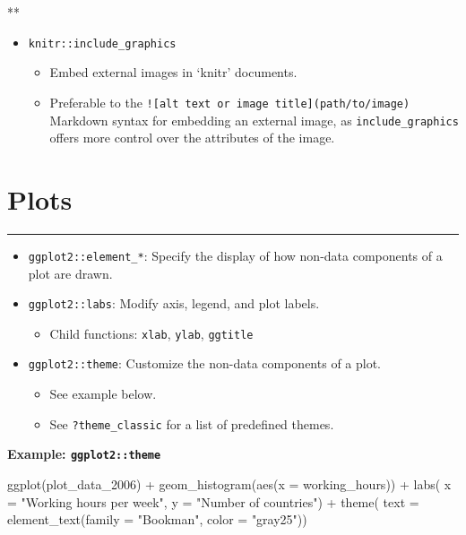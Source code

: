 \documentclass[
]{book}
\newenvironment{Shaded}{\begin{snugshade}}{\end{snugshade}}
\newcommand{\AttributeTok}[1]{\textcolor[rgb]{0.77,0.63,0.00}{#1}}
\newcommand{\FunctionTok}[1]{\textcolor[rgb]{0.00,0.00,0.00}{#1}}
\newcommand{\NormalTok}[1]{#1}
\newcommand{\SpecialCharTok}[1]{\textcolor[rgb]{0.00,0.00,0.00}{#1}}
\newcommand{\StringTok}[1]{\textcolor[rgb]{0.31,0.60,0.02}{#1}}
\providecommand{\tightlist}{%
  \setlength{\itemsep}{0pt}\setlength{\parskip}{0pt}}
\begin{document}
**

\begin{itemize}
\tightlist
\item
  \texttt{knitr::include\_graphics}

  \begin{itemize}
  \tightlist
  \item
    Embed external images in `knitr' documents.
  \item
    Preferable to the \texttt{!{[}alt\ text\ or\ image\ title{]}(path/to/image)} Markdown syntax for embedding an external image, as \texttt{include\_graphics} offers more control over the attributes of the image.
  \end{itemize}
\end{itemize}

\hypertarget{plots}{%
\section{Plots}\label{plots}}

\begin{center}\rule{0.5\linewidth}{0.5pt}\end{center}

\begin{itemize}
\tightlist
\item
  \texttt{ggplot2::element\_*}: Specify the display of how non-data components of a plot are drawn.
\item
  \texttt{ggplot2::labs}: Modify axis, legend, and plot labels.

  \begin{itemize}
  \tightlist
  \item
    Child functions: \texttt{xlab}, \texttt{ylab}, \texttt{ggtitle}
  \end{itemize}
\item
  \texttt{ggplot2::theme}: Customize the non-data components of a plot.

  \begin{itemize}
  \tightlist
  \item
    See example below.
  \item
    See \texttt{?theme\_classic} for a list of predefined themes.
  \end{itemize}
\end{itemize}

\textbf{Example: \texttt{ggplot2::theme}}

\begin{Shaded}
\begin{Highlighting}[]
\FunctionTok{ggplot}\NormalTok{(plot\_data\_2006) }\SpecialCharTok{+}
  \FunctionTok{geom\_histogram}\NormalTok{(}\FunctionTok{aes}\NormalTok{(}\AttributeTok{x =}\NormalTok{ working\_hours)) }\SpecialCharTok{+}
  \FunctionTok{labs}\NormalTok{(}
    \AttributeTok{x =} \StringTok{"Working hours per week"}\NormalTok{,}
    \AttributeTok{y =} \StringTok{"Number of countries"}\NormalTok{) }\SpecialCharTok{+}
  \FunctionTok{theme}\NormalTok{(}
    \AttributeTok{text =} \FunctionTok{element\_text}\NormalTok{(}\AttributeTok{family =} \StringTok{"Bookman"}\NormalTok{, }\AttributeTok{color =} \StringTok{"gray25"}\NormalTok{))}
\end{Highlighting}
\end{Shaded}
\end{document}
